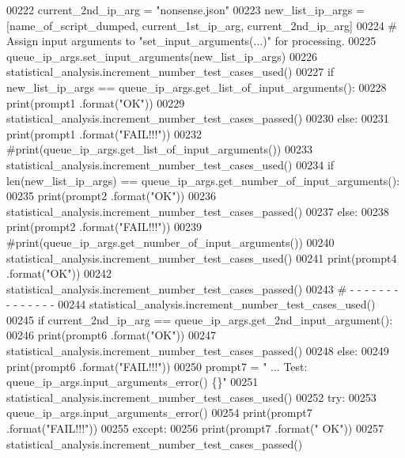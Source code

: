 \begin{DoxyCode}
00222         current\_2nd\_ip\_arg = \textcolor{stringliteral}{"nonsense.json"}
00223         new\_list\_ip\_args = [name\_of\_script\_dumped, current\_1st\_ip\_arg, current\_2nd\_ip\_arg]
00224         \textcolor{comment}{#   Assign input arguments to "set\_input\_arguments(...)" for processing.}
00225         queue\_ip\_args.set\_input\_arguments(new\_list\_ip\_args)
00226         statistical\_analysis.increment\_number\_test\_cases\_used()
00227         \textcolor{keywordflow}{if} new\_list\_ip\_args == queue\_ip\_args.get\_list\_of\_input\_arguments():
00228             print(prompt1 .format(\textcolor{stringliteral}{"OK"}))
00229             statistical\_analysis.increment\_number\_test\_cases\_passed()
00230         \textcolor{keywordflow}{else}:
00231             print(prompt1 .format(\textcolor{stringliteral}{"FAIL!!!"}))
00232             \textcolor{comment}{#print(queue\_ip\_args.get\_list\_of\_input\_arguments())}
00233         statistical\_analysis.increment\_number\_test\_cases\_used()
00234         \textcolor{keywordflow}{if} len(new\_list\_ip\_args) == queue\_ip\_args.get\_number\_of\_input\_arguments():
00235             print(prompt2 .format(\textcolor{stringliteral}{"OK"}))
00236             statistical\_analysis.increment\_number\_test\_cases\_passed()
00237         \textcolor{keywordflow}{else}:
00238             print(prompt2 .format(\textcolor{stringliteral}{"FAIL!!!"}))
00239             \textcolor{comment}{#print(queue\_ip\_args.get\_number\_of\_input\_arguments())}
00240         statistical\_analysis.increment\_number\_test\_cases\_used()
00241         print(prompt4 .format(\textcolor{stringliteral}{"OK"}))
00242         statistical\_analysis.increment\_number\_test\_cases\_passed()
00243         \textcolor{comment}{#   -   -   -   -   -   -   -   -   -   -   -   -   -   -}
00244         statistical\_analysis.increment\_number\_test\_cases\_used()
00245         \textcolor{keywordflow}{if} current\_2nd\_ip\_arg == queue\_ip\_args.get\_2nd\_input\_argument():
00246             print(prompt6 .format(\textcolor{stringliteral}{"OK"}))
00247             statistical\_analysis.increment\_number\_test\_cases\_passed()
00248         \textcolor{keywordflow}{else}:
00249             print(prompt6 .format(\textcolor{stringliteral}{"FAIL!!!"}))
00250         prompt7 = \textcolor{stringliteral}{" ... Test: queue\_ip\_args.input\_arguments\_error() \{\}"}
00251         statistical\_analysis.increment\_number\_test\_cases\_used()
00252         \textcolor{keywordflow}{try}:
00253             queue\_ip\_args.input\_arguments\_error()
00254             print(prompt7 .format(\textcolor{stringliteral}{"FAIL!!!"}))
00255         \textcolor{keywordflow}{except}:
00256             print(prompt7 .format(\textcolor{stringliteral}{" OK"}))
00257             statistical\_analysis.increment\_number\_test\_cases\_passed()
\end{DoxyCode}
